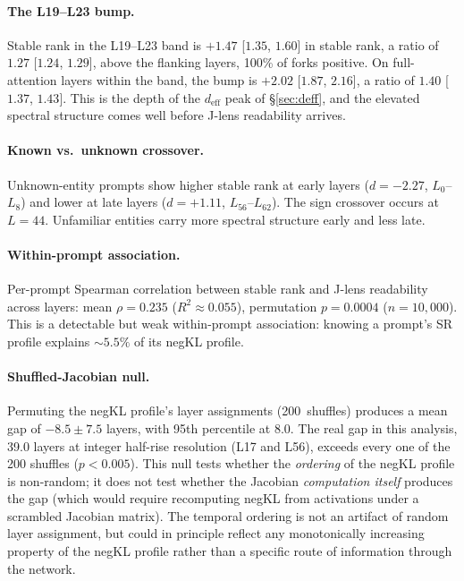\documentclass[11pt,a4paper]{article}
\begin{document}
\paragraph{The L19--L23 bump.} Stable rank in the L19--L23 band
is $+1.47$ [$1.35$, $1.60$] in stable rank, a ratio of $1.27$ [$1.24$, $1.29$],
above the flanking layers, 100\% of forks positive. On full-attention layers
within the band, the bump is $+2.02$ [$1.87$, $2.16$], a ratio of $1.40$ [$1.37$, $1.43$]. This is
the depth of the $d_\text{eff}$ peak of \S\ref{sec:deff}, and the
elevated spectral structure comes well before J-lens readability
arrives.

\paragraph{Known vs.\ unknown crossover.} Unknown-entity prompts show
higher stable rank at early layers ($d{=}{-}2.27$, $L_0$--$L_8$) and
lower at late layers ($d{=}{+}1.11$, $L_{56}$--$L_{62}$). The sign crossover occurs at $L{=}44$. Unfamiliar entities carry more
spectral structure early and less late.

\paragraph{Within-prompt association.} Per-prompt Spearman correlation
between stable rank and J-lens readability across layers: mean
$\rho{=}0.235$ ($R^2 \approx 0.055$), permutation $p{=}0.0004$
($n{=}10{,}000$). This is a detectable but weak within-prompt
association: knowing a prompt's SR profile explains ${\sim}5.5\%$ of
its negKL profile.

\paragraph{Shuffled-Jacobian null.} Permuting the negKL profile's
layer assignments (200~shuffles) produces a mean gap of $-8.5 \pm 7.5$
layers, with 95th percentile at $8.0$. The real gap in this analysis,
39.0 layers at integer half-rise resolution (L17 and L56), exceeds every
one of the 200 shuffles ($p < 0.005$). This null tests whether the
\emph{ordering} of the negKL profile is non-random; it does not test
whether the Jacobian \emph{computation itself} produces the gap
(which would require recomputing negKL from activations under a
scrambled Jacobian matrix). The temporal ordering is not an artifact
of random layer assignment, but could in principle reflect any
monotonically increasing property of the negKL profile rather than a specific route of information through the network.
\end{document}
